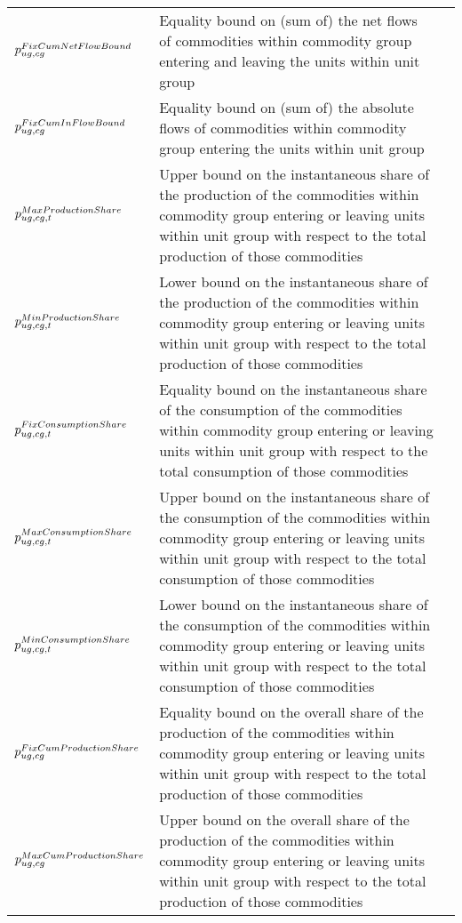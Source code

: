 \begin{longtable}{p{\cola} p{\colc} >{\small\raggedleft\arraybackslash\itshape}p{\colb}}
		$p^{FixCumNetFlowBound}_{ug,cg}$	& Equality bound on (sum of) the net flows of commodities within commodity group \commoditygroup entering and leaving the units within unit group \unitgroup 	&                \\
		$p^{FixCumInFlowBound}_{ug,cg}$	& Equality bound on (sum of) the absolute flows of commodities within commodity group \commoditygroup entering the units within unit group \unitgroup 	&                \\
		$p^{MaxProductionShare}_{ug,cg,t}$	& Upper bound on the instantaneous share of the production of the commodities within commodity group \commoditygroup entering or leaving units within unit group \unitgroup with respect to the total production of those commodities	&                \\
		$p^{MinProductionShare}_{ug,cg,t}$	& Lower bound on the instantaneous share of the production of the commodities within commodity group \commoditygroup entering or leaving units within unit group \unitgroup with respect to the total production of those commodities	&                \\
		$p^{FixConsumptionShare}_{ug,cg,t}$	& Equality bound on the instantaneous share of the consumption of the commodities within commodity group \commoditygroup entering or leaving units within unit group \unitgroup with respect to the total consumption of those commodities	&                \\
		$p^{MaxConsumptionShare}_{ug,cg,t}$	& Upper bound on the instantaneous share of the consumption of the commodities within commodity group \commoditygroup entering or leaving units within unit group \unitgroup with respect to the total consumption of those commodities	&                \\
		$p^{MinConsumptionShare}_{ug,cg,t}$	& Lower bound on the instantaneous share of the consumption of the commodities within commodity group \commoditygroup entering or leaving units within unit group \unitgroup with respect to the total consumption of those commodities	&                \\
		$p^{FixCumProductionShare}_{ug,cg}$	& Equality bound on the overall share of the production of the commodities within commodity group \commoditygroup entering or leaving units within unit group \unitgroup with respect to the total production of those commodities	&                \\
		$p^{MaxCumProductionShare}_{ug,cg}$	& Upper bound on the overall share of the production of the commodities within commodity group \commoditygroup entering or leaving units within unit group \unitgroup with respect to the total production of those commodities	&                \\

\end{longtable}
